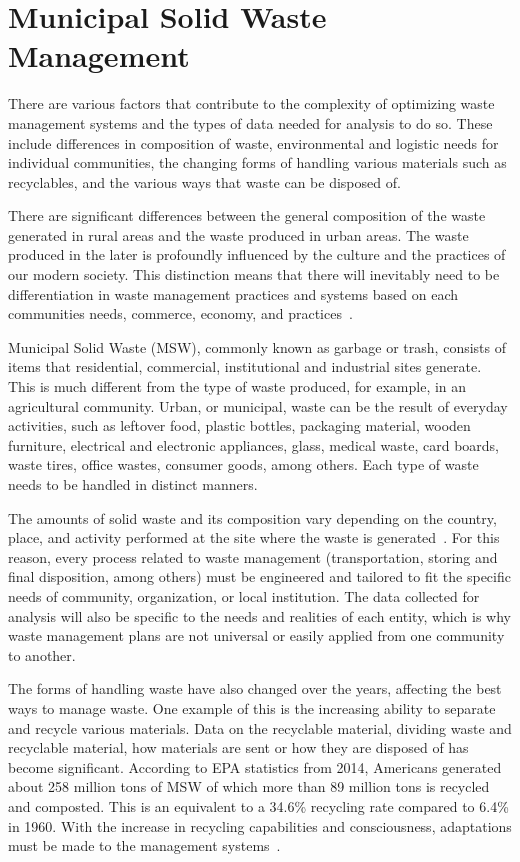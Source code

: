 \section{ Municipal Solid Waste Management}

There are various factors that contribute to the complexity of optimizing 
waste management systems and the types of data needed for analysis to do so.  
These include differences in composition of waste, environmental and 
logistic needs for individual communities, the changing forms of handling 
various materials such as recyclables, and the various ways that waste 
can be disposed of.  

There are significant differences between the general composition of the 
waste generated in rural areas and the waste produced in urban areas. The 
waste produced in the later is profoundly influenced by the culture and 
the practices of our modern society.  This distinction means that there 
will inevitably need to be differentiation in waste management practices 
and systems based on each communities needs, commerce, economy, and 
practices~\cite{chandrappa2012}.

Municipal Solid Waste (MSW), commonly known as garbage or trash, consists 
of items that residential, commercial, institutional and industrial sites 
generate. This is much different from the type of waste produced, for 
example, in an agricultural community.  Urban, or municipal, waste can be 
the result of everyday activities, such as leftover food, plastic bottles, 
packaging material, wooden furniture, electrical and electronic appliances, 
glass, medical waste, card boards, waste tires, office wastes, consumer goods, 
among others.  Each type of waste needs to be handled in distinct manners.  

The amounts of solid waste and its composition vary depending on the country, 
place, and activity performed at the site where the waste is 
generated~\cite{chandrappa2012}. For this reason, every process related to 
waste management (transportation, storing and final disposition, among others) 
must be engineered and tailored to fit the specific needs of community, 
organization, or local institution. The data collected for analysis will 
also be specific to the needs and realities of each entity, which is why 
waste management plans are not universal or easily applied from one 
community to another.  

The forms of handling waste have also changed over the years, affecting the 
best ways to manage waste.  One example of this is the increasing ability 
to separate and recycle various materials. Data on the recyclable material, 
dividing waste and recyclable material, how materials are sent or how they 
are disposed of has become significant. According to EPA statistics from 
2014, Americans generated about 258 million tons of MSW of which more than 
89 million tons is recycled and composted. This is an equivalent to a 34.6\% 
recycling rate compared to 6.4\% in 1960. With the increase in recycling 
capabilities and consciousness, adaptations must be made to the management 
systems~\cite{epa2014}.  

